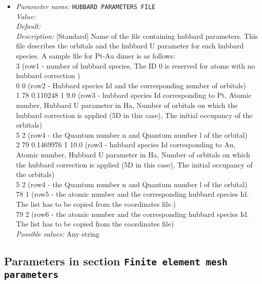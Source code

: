 \begin{itemize}
\item {\it Parameter name:} {\tt HUBBARD PARAMETERS FILE}
\label{parameters:Hubbard Parameters/HUBBARD PARAMETERS FILE}
\label{parameters:Hubbard/HUBBARD_PARAMETERS_FILE}
 \\
{\it Value:} \\
{\it Default:}\\
{\it Description:} [Standard] Name of the file containing hubbard parameters. This file describes the orbitals and the hubbard U parameter for each hubbard species.  A sample file for Pt-Au dimer is as follows: \\ 3 (row1 - number of hubbard species, The ID 0 is reserved for atoms with no hubbard correction )\\
0 0 (row2 - Hubbard species Id and the corresponding number of orbitals)\\ 1 78 0.110248 1 9.0 (row3 - hubbard species Id corresponding to Pt, Atomic number, Hubbard U parameter in Ha, Number of orbitals on which the hubbard correction is applied (5D in this case), The initial occupancy of the orbitals)\\
5 2 (row4 - the Quantum number n and Quantum number l of the orbital)\\
2 79 0.1469976 1 10.0 (row3 - hubbard species Id corresponding to Au, Atomic number, Hubbard U parameter in Ha, Number of orbitals on which the hubbard correction is applied (5D in this case), The initial occupancy of the orbitals)\\
5 2 (row4 - the Quantum number n and Quantum number l of the orbital)\\
78 1 (row5 - the atomic number and the corresponding hubbard species Id. The list has to be copied from the coordinates file.)\\
79 2 (row6 - the atomic number and the corresponding hubbard species Id. The list has to be copied from the coordinates file)\\

{\it Possible values:} Any string
\end{itemize}


\subsection{Parameters in section \tt Finite element mesh parameters}
\label{parameters:Finite_20element_20mesh_20parameters}

